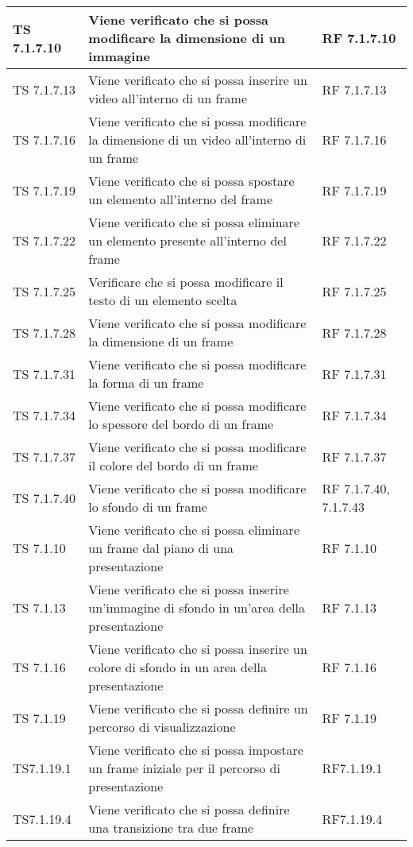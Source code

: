 {{\begin{longtable} [c]{| p{3cm} | p{6cm} |p{3cm}|}
			\hline
			TS 7.1.7.10 & Viene verificato che si possa modificare la dimensione di un immagine & RF 7.1.7.10\\
			\hline
			TS 7.1.7.13 & Viene verificato che si possa inserire un video all'interno di un frame & RF 7.1.7.13\\
			\hline
			TS 7.1.7.16 & Viene verificato che si possa modificare la dimensione di un video all'interno di un frame & RF 7.1.7.16\\
			\hline
			TS 7.1.7.19 & Viene verificato che si possa spostare un elemento all'interno del frame & RF 7.1.7.19\\
			\hline
			TS 7.1.7.22 & Viene verificato che si possa eliminare un elemento presente all'interno del frame & RF 7.1.7.22 \\
			\hline
			TS 7.1.7.25 & Verificare che si possa modificare il testo di un elemento scelta & RF 7.1.7.25\\
			\hline
			TS 7.1.7.28 & Viene verificato che si possa modificare la dimensione di un frame & RF 7.1.7.28\\
			\hline
			TS 7.1.7.31 & Viene verificato che si possa modificare la forma di un frame & RF 7.1.7.31\\
			\hline
			TS 7.1.7.34 & Viene verificato che si possa modificare lo spessore del bordo di un frame & RF 7.1.7.34\\
			\hline
			TS 7.1.7.37 & Viene verificato che si possa modificare il colore del bordo di un frame & RF 7.1.7.37\\
			\hline
			TS 7.1.7.40 & Viene verificato che si possa modificare lo sfondo di un frame & RF 7.1.7.40, 7.1.7.43\\
			\hline
			TS 7.1.10 & Viene verificato che si possa eliminare un frame dal piano di una presentazione & RF 7.1.10\\
			\hline
			TS 7.1.13 & Viene verificato che si possa inserire un'immagine di sfondo in un'area della presentazione & RF 7.1.13 \\
			\hline
			TS 7.1.16 & Viene verificato che si possa inserire un colore di sfondo in un area della presentazione & RF 7.1.16\\
			\hline
			TS 7.1.19 & Viene verificato che si possa definire un percorso di visualizzazione & RF 7.1.19\\
			\hline				
			TS7.1.19.1 & Viene verificato che si possa impostare un frame iniziale per il percorso di presentazione & RF7.1.19.1\\
			TS7.1.19.4 & Viene verificato che si possa definire una transizione tra due frame & RF7.1.19.4\\

\end{longtable}}}
